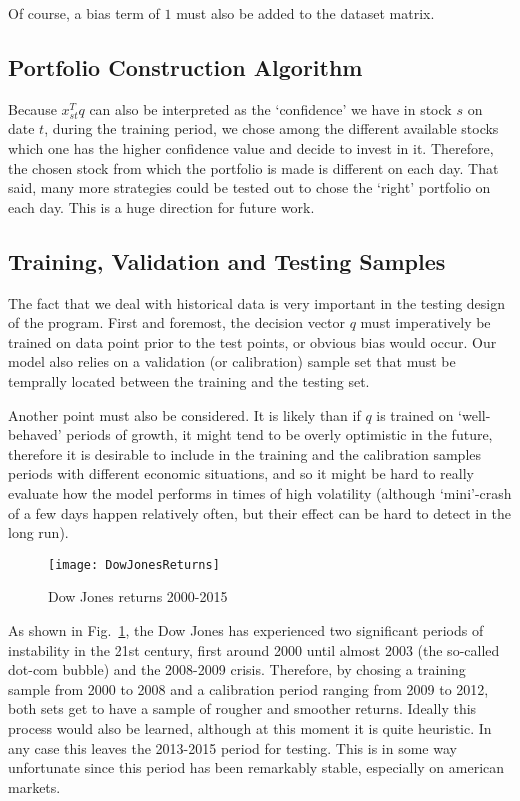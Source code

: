 \documentclass[11pt,fleqn]{article}
\newcommand{\figref}[1]{Fig.~\ref{#1}}
\begin{document}
Of course, a bias term of $1$ must also be added to the dataset matrix. 


\subsection{Portfolio Construction Algorithm}

Because $x_{st}^Tq$ can also be interpreted as the `confidence' we have in stock $s$ on
date $t$, during the training period, we chose among the different available stocks which
one has the higher confidence value and decide to invest in it. Therefore, the chosen
stock from which the portfolio is made is different on each day. That said, many more
strategies could be tested out to chose the `right' portfolio on each day. This is a huge
direction for future work.


\subsection{Training, Validation and Testing Samples}

The fact that we deal with historical data is very important in the testing design of the
program. First and foremost, the decision vector $q$ must imperatively be trained on data
point prior to the test points, or obvious bias would occur. Our model also relies on a
validation (or calibration) sample set that must be temprally located between the training
and the testing set.

Another point must also be considered. It is likely than if $q$ is trained on
`well-behaved' periods of growth, it might tend to be overly optimistic in the future,
therefore it is desirable to include in the training and the calibration samples periods
with different economic situations, and so it might be hard to really evaluate how the
model performs in times of high volatility (although `mini'-crash of a few days happen
relatively often, but their effect can be hard to detect in the long run).

\begin{figure}
  \centering
  \texttt{[image: DowJonesReturns]}
  \caption{Dow Jones returns 2000-2015}
  \label{fig:dowjonesreturns}
\end{figure}

As shown in \figref{fig:dowjonesreturns}, the Dow Jones has experienced two significant
periods of instability in the 21st century, first around 2000 until almost 2003 (the
so-called dot-com bubble) and the 2008-2009 crisis. Therefore, by chosing a training
sample from 2000 to 2008 and a calibration period ranging from 2009 to 2012, both sets get
to have a sample of rougher and smoother returns. Ideally this process would also be
learned, although at this moment it is quite heuristic. In any case this leaves the
2013-2015 period for testing. This is in some way unfortunate since this period has been
remarkably stable, especially on american markets.
\end{document}
